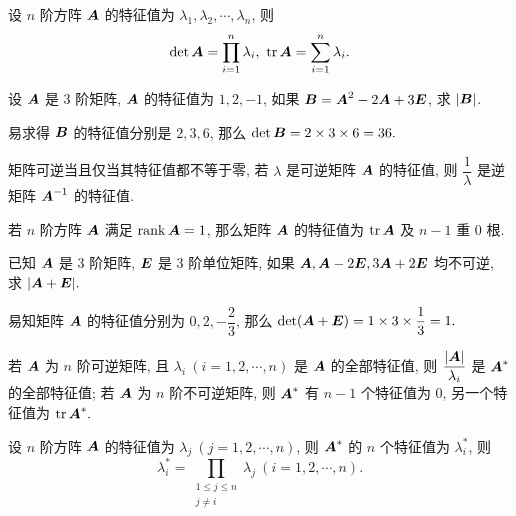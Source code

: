\begin{theorem}[特征值的积与和]
    设 $n$ 阶方阵 $\vb*{A}$ 的特征值为 $\lambda_1,\lambda_2,\cdots,\lambda_n$, 则 $$\displaystyle\det\vb*{A}=\prod_{i=1}^{n}\lambda_i,~\tr\vb*{A}=\sum_{i=1}^{n}\lambda_i.$$
\end{theorem}

\begin{example}
    设 $\vb*{A}$ 是 3 阶矩阵, $\vb*{A}$ 的特征值为 $1,2,-1$, 如果 $\vb*{B}=\vb*{A}^2-2\vb*{A}+3\vb*{E}$, 求 $|\vb*{B}|$.
\end{example}
\begin{solution}
    易求得 $\vb*{B}$ 的特征值分别是 $2,3,6$, 那么 $\det\vb*{B}=2\times3\times6=36.$
\end{solution}

\begin{theorem}[逆矩阵的特征值]
    矩阵可逆当且仅当其特征值都不等于零, 若 $\lambda$ 是可逆矩阵 $\vb*{A}$ 的特征值, 则 $\dfrac{1}{\lambda}$ 是逆矩阵 $\vb*{A}^{-1}$ 的特征值.
\end{theorem}

\begin{theorem}[秩一矩阵的特征值]
    若 $n$ 阶方阵 $\vb*{A}$ 满足 $\rank\vb*{A}=1$, 那么矩阵 $\vb*{A}$ 的特征值为 $\tr\vb*{A}$ 及 $n-1$ 重 0 根.
\end{theorem}

\begin{example}
    已知 $\vb*{A}$ 是 3 阶矩阵, $\vb*{E}$ 是 3 阶单位矩阵, 如果 $\vb*{A},\vb*{A}-2\vb*{E},3\vb*{A}+2\vb*{E}$ 均不可逆, 求 $|\vb*{A}+\vb*{E}|.$
\end{example}
\begin{solution}
    易知矩阵 $\vb*{A}$ 的特征值分别为 $0,2,-\dfrac{2}{3}$, 那么 $\det(\vb*{A}+\vb*{E})=1\times3\times\dfrac{1}{3}=1.$
\end{solution}

\begin{theorem}[伴随矩阵的特征值 A]
    若 $\vb*{A}$ 为 $n$ 阶可逆矩阵, 且 $\lambda_i~ (i=1,2,\cdots,n)$ 是 $\vb*{A}$ 的全部特征值, 则 $\dfrac{|\vb*{A}|}{\lambda_i}$ 是 $\vb*{A}^*$ 的全部特征值; 
    若 $\vb*{A}$ 为 $n$ 阶不可逆矩阵, 则 $\vb*{A}^*$ 有 $n-1$ 个特征值为 0, 另一个特征值为 $\tr\vb*{A}^*.$
\end{theorem}

\begin{theorem}[伴随矩阵的特征值 B]
    \label{bsjzdtzzB}设 $n$ 阶方阵 $\vb*{A}$ 的特征值为 $\lambda_j~ (j=1,2,\cdots,n)$, 则 $\vb*{A}^*$ 的 $n$ 个特征值为 $\lambda_i^*$, 则
    $$\lambda_i^*=\prod_{\substack{1\leqslant j\leqslant n\\j\neq i}}\lambda_j~  (i=1,2,\cdots,n).$$
\end{theorem}

